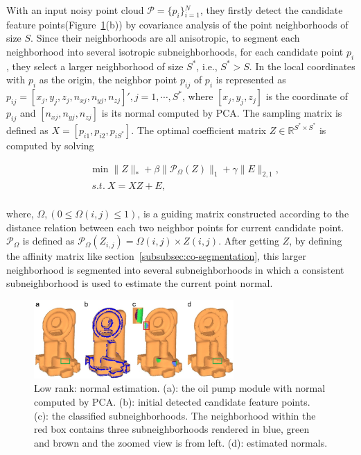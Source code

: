 With an input noisy point cloud $ \mathcal{P}=\{ p_{i} \} {_{i=1}^{N}} $,
they firstly detect the candidate feature points(Figure~\ref{fig:normal_lowrank}(b)) by covariance analysis of the point neighborhoods of size $S$.
Since their neighborhoods are all anisotropic, to segment each neighborhood into several isotropic subneighborhoods,
for each candidate point $p_{i}$, they select a larger neighborhood of size $S^{*}$, i.e., $S^{*}>S$.
In the local coordinates with $p_{i}$ as the origin, the neighbor point $p_{ij}$ of $p_{i}$ is represented as $p_{ij}=[x_{j},y_{j},z_{j},n_{xj},n_{yj},n_{zj}]',j=1,\cdots,S^{*}$,
where $[x_{j},y_{j},z_{j}]$ is the coordinate of $p_{ij}$ and
$[n_{xj},n_{yj},n_{zj}]$ is its normal computed by PCA.
The sampling matrix is defined as $X=[p_{i1},p_{i2},p_{iS^{*}}]$.
The optimal coefficient matrix $Z\in \mathbb{R}^{S^{*}\times S^{*}}$ is computed by solving

\small{
\begin{equation}
 \label{eq:LRSCPK}
 \begin{split}
 & \min \|Z\|_{*} + \beta \| \mathcal{P}_{\Omega}(Z) \|_1
 + \gamma \| E \|_{2,1} ,\\
 &~s.t.~X=XZ+E,
 \end{split}
\end{equation}
}
\\
where, $\Omega,(0\leq\Omega(i,j)\leq1)$, is a guiding matrix constructed according to the distance relation between each two neighbor points for current candidate point. $\mathcal{P}_{\Omega}$ is defined as  $\mathcal{P}_{\Omega}(Z_{i,j})=\Omega(i,j)\times Z(i,j)$.
After getting $Z$, by defining the affinity matrix like section~\ref{subsubsec:co-segmentation}, this larger neighborhood is segmented into several subneighborhoods in which a consistent subneighborhood is used to estimate the current point normal.

\begin{figure}[ht]
  \centering
  \includegraphics[width=3in]{images/normal_lowrank}
  \caption{Low rank: normal estimation\cite{zhang2013point}. (a): the oil pump module with normal computed by PCA. (b): initial detected candidate feature points. (c): the classified subneighborhoods. The neighborhood within the red box contains three subneighborhoods rendered in blue, green and brown and the zoomed view is from left. (d): estimated normals.}
  \label{fig:normal_lowrank}
\end{figure}
